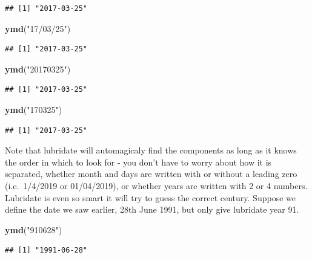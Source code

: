 \documentclass[]{tufte-book}
\newenvironment{Shaded}{}{}
\newcommand{\KeywordTok}[1]{\textcolor[rgb]{0.00,0.44,0.13}{\textbf{#1}}}
\newcommand{\NormalTok}[1]{#1}
\newcommand{\StringTok}[1]{\textcolor[rgb]{0.25,0.44,0.63}{#1}}
\begin{document}
\begin{verbatim}
## [1] "2017-03-25"
\end{verbatim}

\begin{Shaded}
\begin{Highlighting}[]
\KeywordTok{ymd}\NormalTok{(}\StringTok{"17/03/25"}\NormalTok{)}
\end{Highlighting}
\end{Shaded}

\begin{verbatim}
## [1] "2017-03-25"
\end{verbatim}

\begin{Shaded}
\begin{Highlighting}[]
\KeywordTok{ymd}\NormalTok{(}\StringTok{"20170325"}\NormalTok{)}
\end{Highlighting}
\end{Shaded}

\begin{verbatim}
## [1] "2017-03-25"
\end{verbatim}

\begin{Shaded}
\begin{Highlighting}[]
\KeywordTok{ymd}\NormalTok{(}\StringTok{"170325"}\NormalTok{)}
\end{Highlighting}
\end{Shaded}

\begin{verbatim}
## [1] "2017-03-25"
\end{verbatim}

Note that lubridate will automagicaly find the components as long as it knows the order in which to look for - you don't have to worry about how it is separated, whether month and days are written with or without a leading zero (i.e.~1/4/2019 or 01/04/2019), or whether years are written with 2 or 4 numbers. Lubridate is even so smart it will try to guess the correct century. Suppose we define the date we saw earlier, 28th June 1991, but only give lubridate year 91.

\begin{Shaded}
\begin{Highlighting}[]
\KeywordTok{ymd}\NormalTok{(}\StringTok{"910628"}\NormalTok{)}
\end{Highlighting}
\end{Shaded}

\begin{verbatim}
## [1] "1991-06-28"
\end{verbatim}
\end{document}

